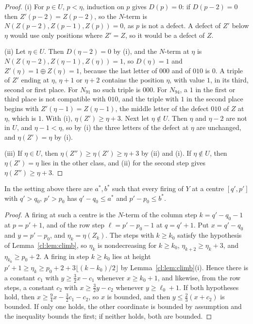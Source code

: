 \begin{proof}
(i) For $p\in U$, $p<\eta$, induction on $p$ gives $D(p)=0$: if $D(p-2)=0$ then $Z'(p-2)=Z(p-2)$, so the $N$-term is $N(Z(p-2),Z(p-1),Z(p))=0$, as $p$ is not a defect. A defect of $Z'$ below $\eta$ would use only positions where $Z'=Z$, so it would be a defect of $Z$.

(ii) Let $\eta\in U$. Then $D(\eta-2)=0$ by (i), and the $N$-term at $\eta$ is $N(Z(\eta-2),Z(\eta-1),Z(\eta))=1$, so $D(\eta)=1$ and $Z'(\eta)=1\oplus Z(\eta)=1$, because the last letter of $000$ and of $010$ is $0$. A triple of $Z'$ ending at $\eta$, $\eta+1$ or $\eta+2$ contains the position $\eta$, with value $1$, in its third, second or first place. For $N_{91}$ no such triple is $000$. For $N_{94}$, a $1$ in the first or third place is not compatible with $010$, and the triple with $1$ in the second place begins with $Z'(\eta-1)=Z(\eta-1)$, the middle letter of the defect $010$ of $Z$ at $\eta$, which is $1$. With (i), $\eta(Z')\ge\eta+3$. Next let $\eta\notin U$. Then $\eta$ and $\eta-2$ are not in $U$, and $\eta-1<\eta$, so by (i) the three letters of the defect at $\eta$ are unchanged, and $\eta(Z')=\eta$ by (i).

(iii) If $\eta\in U$, then $\eta(Z'')\ge\eta(Z')\ge\eta+3$ by (ii) and (i). If $\eta\notin U$, then $\eta(Z')=\eta$ lies in the other class, and (ii) for the second step gives $\eta(Z'')\ge\eta+3$.
\end{proof}

\begin{lemma}\label{cl:lem:fire}
In the setting above there are $a^*,b^*$ such that every firing of $Y$ at a centre $[q',p']$ with $q'>q_0$, $p'>p_0$ has $q'-q_0\le a^*$ and $p'-p_0\le b^*$.
\end{lemma}

\begin{proof}
A firing at such a centre is the $N$-term of the column step $k=q'-q_0-1$ at $p=p'+1$, and of the row step $\ell=p'-p_0-1$ at $q=q'+1$. Put $x=q'-q_0$ and $y=p'-p_0$, and $\eta_k=\eta(Z_k)$. The steps with $k\ge k_0$ satisfy the hypothesis of Lemma~\ref{cl:lem:climb}, so $\eta_k$ is nondecreasing for $k\ge k_0$, $\eta_{k+2}\ge\eta_k+3$, and $\eta_{k_0}\ge p_0+2$. A firing in step $k\ge k_0$ lies at height $p'+1\ge\eta_k\ge p_0+2+3\lfloor(k-k_0)/2\rfloor$ by Lemma~\ref{cl:lem:climb}(i). Hence there is a constant $c_1$ with $y\ge\frac32x-c_1$ whenever $x\ge k_0+1$, and likewise, from the row steps, a constant $c_2$ with $x\ge\frac32y-c_2$ whenever $y\ge\ell_0+1$. If both hypotheses hold, then $x\ge\frac94x-\frac32c_1-c_2$, so $x$ is bounded, and then $y\le\frac23(x+c_2)$ is bounded. If only one holds, the other coordinate is bounded by assumption and the inequality bounds the first; if neither holds, both are bounded.
\end{proof}

